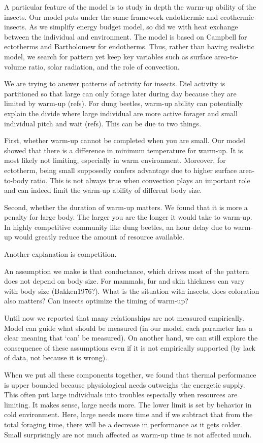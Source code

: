 A particular feature of the model is to study in depth the warm-up ability of the insects.
Our model puts under the same framework endothermic and ecothermic insects.
As we simplify energy budget model, so did we with heat exchange between the individual and environment.
The model is based on Campbell for ectotherms and Bartholomew for endotherms.
Thus, rather than having realistic model, we search for pattern yet keep key variables such as surface area-to-volume ratio, solar radiation, and the role of convection.

We are trying to answer patterns of activity for insects.
Diel activity is partitioned so that large can only forage later during day because they are limited by warm-up (refs).
For dung beetles, warm-up ability can potentially explain the divide where large individual are more active forager and small individual pitch and wait (refs).
This can be due to two things.

First, whether warm-up cannot be completed when you are small.
Our model showed that there is a difference in minimum temperature for warm-up. 
It is most likely not limiting, especially in warm environment.
Moreover, for ectotherm, being small supposedly confers advantage due to higher surface area-to-body ratio. 
This is not always true when convection plays an important role and can indeed limit the warm-up ability of different body size.

Second, whether the duration of warm-up matters.
We found that it is more a penalty for large body.
The larger you are the longer it would take to warm-up.
In highly competitive community like dung beetles, an hour delay due to warm-up would greatly reduce the amount of resource available. 

Another explanation is competition.

An assumption we make is that conductance, which drives most of the pattern does not depend on body size.
For mammals, fur and skin thickness can vary with body size (Bakken1976?).
What is the situation with insects, does coloration also matters?
Can insects optimize the timing of warm-up?

Until now we reported that many relationships are not measured empirically.
Model can guide what should be measured (in our model, each parameter has a clear meaning that `can' be measured).
On another hand, we can still explore the consequence of these assumptions even if it is not empirically supported (by lack of data, not because it is wrong).

When we put all these components together, we found that thermal performance is upper bounded because physiological needs outweighs the energetic supply.
This often put large individuals into troubles especially when resources are limiting.
It makes sense, large needs more.
The lower limit is set by behavior in cold environment.
Here, large needs more time and if we subtract that from the total foraging time,  there will be a decrease in performance as it gets colder.
Small surprisingly are not much affected as warm-up time is not affected much.

